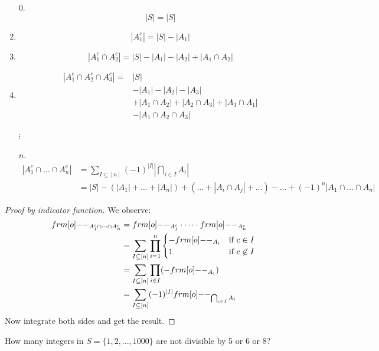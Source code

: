 \documentclass[12pt]{article}
\begin{document}
\begin{theorem}\hfill
    \begin{enumerate}
        \item[0.] $$|S|=|S|$$
        \item $$\left|A_1^c\right| = |S|-|A_1|$$
        \item \[\left|A_1^c\cap A_2^c\right| = |S| -|A_1|-|A_2|+|A_1\cap A_2|\]
        \item \begin{align*}
            \left|A_1^c\cap A_2^c\cap A_3^c\right| =& |S|\\
            &- |A_1|-|A_2|-|A_3|\\
            &+ |A_1\cap A_2| + |A_2\cap A_3| + |A_3\cap A_1|\\
            &- |A_1\cap A_2\cap A_3|
        \end{align*}
        \item[$\vdots$]
        \item[$n$.] \begin{align*}
            \left|A_1^c\cap \dots\cap A_n^c\right| &= \sum_{I\subseteq [n]}(-1)^{|I|}\left|\bigcap_{i\in I}A_i\right|\\
            &= |S|-(|A_1|+\dots+|A_n|)+(\dots+|A_i\cap A_j|+\dots)-\dots+(-1)^n|A_1\cap\dots\cap A_n|
        \end{align*}
    \end{enumerate}
\end{theorem}
\begin{proof}[Proof by indicator function]
    We observe: \begin{align*}
        \1_{A_1^c\cap\dots\cap A_n^c} &= \1_{A_1^c}\cdot \dots\cdot \1_{A_n^c}\\
        &= \sum_{I\subseteq[n]}\prod_{i=1}^{n}\begin{cases}
            -\1_{A_i} &\text{if }c\in I\\
            1 & \text{if }c\not\in I
        \end{cases}\\
        &= \sum_{I\subseteq[n]} \prod_{i\in I}(-\1_{A_i})\\
        &= \sum_{I\subseteq[n]} (-1)^{|I|} \1_{\bigcap_{i\in I}A_i}
    \end{align*}
    Now integrate both sides and get the result.
\end{proof}

\spl

\eg How many integers in $S=\{1,2,\dots,1000\}$ are not divisible by 5 or 6 or 8?
\end{document}
